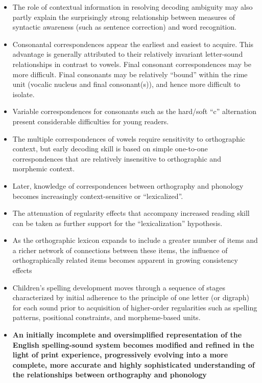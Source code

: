 \documentclass[]{article}
\begin{document}
{\begin{itemize}
			\item The role of contextual information in resolving decoding ambiguity may also partly explain the surprisingly strong relationship between measures of syntactic awareness (such as sentence correction) and word recognition.
			\item Consonantal correspondences appear the earliest and easiest to acquire. This advantage is generally attributed to their relatively invariant letter-sound relationships in contrast to vowels. Final consonant correspondences may be more difficult. Final consonants may be relatively ``bound'' within the rime unit (vocalic nucleus and final consonant(s)), and hence more difficult to isolate.
			\item Variable correspondences for consonants such as the hard/soft ``c'' alternation present considerable difficulties for young readers. 
			\item The multiple correspondences of vowels require sensitivity to orthographic context, but early decoding skill is based on simple one-to-one correspondences that are relatively insensitive to orthographic and morphemic context.
			\item Later, knowledge of correspondences between orthography and 	phonology becomes increasingly context-sensitive or ``lexicalized''.
			\item The attenuation of regularity effects that accompany increased reading skill can be taken as further support for the ``lexicalization'' hypothesis.
			\item As the orthographic lexicon expands to include a greater number of items and a richer network of connections between these items, the influence of orthographically related items becomes apparent in growing consistency effects
			\item Children's spelling development moves through a sequence of stages characterized by initial adherence to the principle of one letter (or digraph) for each sound prior to acquisition of higher-order regularities such as spelling patterns, positional constraints, and morpheme-based units.
			\item \textbf{An initially incomplete and oversimplified representation of the English spelling-sound system becomes modified and refined in the light of print experience, progressively evolving into a more complete, more accurate and highly sophisticated understanding of the relationships between orthography and phonology}
	\end{itemize}
	
}
\end{document}
